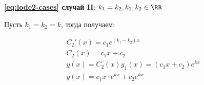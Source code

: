 
\textbf{\eqref{eq:lode2-cases} случай II}:
\(k_{1} = k_{2}, k_{1}, k_{2} \in \RR\)

Пусть \(k_{1} = k_{2} = k\), тогда получаем:

\begin{align*}
  C_{2}'(x) = c_{1} e^{(k_{1} - k_{2}) x} \\
  C_{2}(x) = c_{1} x + c_{2} \\
  y(x)
  = C_{2}(x) y_{1}(x)
  = (c_{1} x + c_{2}) e^{k x} \\
  y(x) = c_{1} x \cdot e^{k x} + c_{2} e^{k x}
\end{align*}
